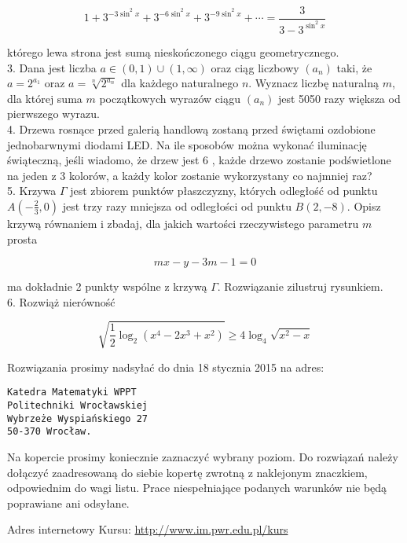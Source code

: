 \documentclass[10pt]{article}
\begin{document}
$$
1+3^{-3 \sin ^{2} x}+3^{-6 \sin ^{2} x}+3^{-9 \sin ^{2} x}+\cdots=\frac{3}{3-3^{\sin ^{2} x}}
$$

którego lewa strona jest sumą nieskończonego ciągu geometrycznego.\\
3. Dana jest liczba $a \in(0,1) \cup(1, \infty)$ oraz ciąg liczbowy $\left(a_{n}\right)$ taki, że $a=2^{a_{1}}$ oraz $a=\sqrt[n]{2^{a_{n}}}$ dla każdego naturalnego $n$. Wyznacz liczbę naturalną $m$, dla której suma $m$ początkowych wyrazów ciągu $\left(a_{n}\right)$ jest 5050 razy większa od pierwszego wyrazu.\\
4. Drzewa rosnące przed galerią handlową zostaną przed świętami ozdobione jednobarwnymi diodami LED. Na ile sposobów można wykonać iluminację świąteczną, jeśli wiadomo, że drzew jest 6 , każde drzewo zostanie podświetlone na jeden z 3 kolorów, a każdy kolor zostanie wykorzystany co najmniej raz?\\
5. Krzywa $\Gamma$ jest zbiorem punktów płaszczyzny, których odległość od punktu $A\left(-\frac{2}{3}, 0\right)$ jest trzy razy mniejsza od odległości od punktu $B(2,-8)$. Opisz krzywą równaniem i zbadaj, dla jakich wartości rzeczywistego parametru $m$ prosta

$$
m x-y-3 m-1=0
$$

ma dokładnie 2 punkty wspólne z krzywą $\Gamma$. Rozwiązanie zilustruj rysunkiem.\\
6. Rozwiąż nierówność

$$
\sqrt{\frac{1}{2} \log _{2}\left(x^{4}-2 x^{3}+x^{2}\right)} \geqslant 4 \log _{4} \sqrt{x^{2}-x}
$$

Rozwiązania prosimy nadsyłać do dnia 18 stycznia 2015 na adres:

\begin{verbatim}
Katedra Matematyki WPPT
Politechniki Wrocławskiej
Wybrzeże Wyspiańskiego 27
50-370 Wrocław.
\end{verbatim}

Na kopercie prosimy koniecznie zaznaczyć wybrany poziom. Do rozwiązań należy dołączyć zaadresowaną do siebie kopertę zwrotną z naklejonym znaczkiem, odpowiednim do wagi listu. Prace niespełniające podanych warunków nie będą poprawiane ani odsyłane.

Adres internetowy Kursu: \href{http://www.im.pwr.edu.pl/kurs}{http://www.im.pwr.edu.pl/kurs}
\end{document}
